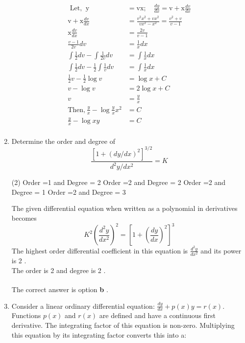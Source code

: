 \begin{enumerate}[label=\color{ocre}\textbf{\arabic*.}]
	\begin{answer}
		\begin{align*}
		\text {  Let, }\ \mathrm{y}&=\mathrm{v} \mathrm{x} ; \quad  \frac{d y}{d x}=\mathrm{v}+\mathrm{x} \frac{d v}{d x}\\
		\mathrm{v}+\mathrm{x} \frac{d v}{d x}&=\frac{v^{2}x^{2}+v x^{2}}{v x^{2}-x^{2}}=\frac{v^{2}+v }{v -1}\\
		\mathrm{x} \frac{d v}{d x}&=\frac{2v}{v-1}\\
		\frac{v-1}{2v}{d v}&=\frac{1}{x}{d x}\\
		\int \frac{1}{2} dv-\int \frac{1}{2v} dv&=\int \frac{1}{x} dx\\
		\int \frac{1}{2} dv- \frac{1}{2}\int\frac{1}{v} dv&=\int \frac{1}{x} dx\\
		\frac{1}{2}v- \frac{1}{2}\log{v} &=\log{x}+C\\
		v- \log{v} &=2\log{x}+C\\
		v&=\frac{y}{x}\\
		\text{Then,}\ \frac{y}{x}-\log{{\frac{y}{x}}x^{2}}&=C\\
		\frac{y}{x}-\log{xy}&=C\\
		\end{align*}
	\end{answer}
	\item  Determine the order and degree of
	$$
	\frac{\left[1+(d y / d x)^{2}\right]^{3 / 2}}{d^{2} y / d x^{2}}=K
	$$
	\begin{tasks}(2)
		\task[\textbf{a.}] Order =1 and Degree = 2
		\task[\textbf{b.}] Order =2 and Degree = 2
		\task[\textbf{c.}] Order =2 and Degree = 1
		\task[\textbf{d.}]Order =2 and Degree = 3
	\end{tasks}
	\begin{answer}
		The given differential equation when written as a polynomial in derivatives becomes
		$$
		K^{2}\left(\frac{d^{2} y}{d x^{2}}\right)^{2}=\left[1+\left(\frac{d y}{d x}\right)^{2}\right]^{3}
		$$
		The highest order differential coefficient in this
		equation is $\frac{d^{2} y}{d x^{2}}$ and its power is 2 .
		\\The order is 2 and degree is 2 .\\\\The correct answer is option \textbf{b} .
	\end{answer}
	\item Consider a linear ordinary differential equation:
	$\frac{d y}{d x}+p(x) y=r(x)$. Functions $p(x)$ and $r(x)$ are defined and have a continuous first derivative. The integrating factor of this equation is non-zero. Multiplying this equation by its integrating factor converts this into a:
	

\end{enumerate}
